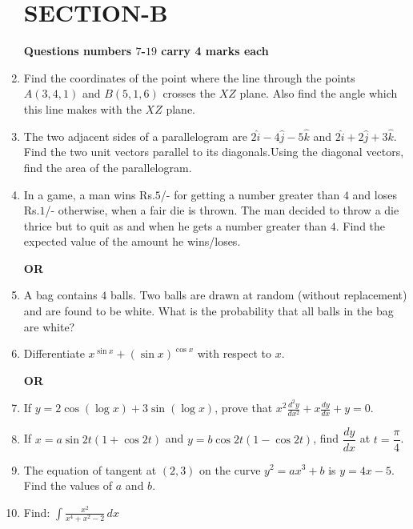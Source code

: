\documentclass[a4paper,12pt]{article}
\begin{document}
\begin{enumerate}[label=\textbf{\arabic*.}]
\begin{center}
	\section*{\large \textbf{SECTION-B}}
	\textbf{Questions numbers $7$-$19$ carry 4 marks each}
\end{center}
	\vspace{1em}
	\item Find the coordinates of the point where the line through the points $A(3, 4, 1)$ and $B(5, 1, 6)$ crosses the $XZ$ plane. Also find the angle which this line makes with the $XZ$ plane.
	\vspace{0.5em}
	\item The two adjacent sides of a parallelogram are $2\hat{i} - 4\hat{j} - 5\hat{k}$ and $2\hat{i} + 2\hat{j} + 3\hat{k}$. Find the two unit vectors parallel to its diagonals.Using the diagonal vectors, find the area of the parallelogram.
	\vspace{0.5em}
	\item In a game, a man wins Rs.$5$/- for getting a number greater than $4$ and loses Rs.$1$/- otherwise, when a fair die is thrown. The man decided to throw a die thrice but to quit as and when he gets a number greater than $4$. Find the expected value of the amount he wins/loses.
\begin{center}
    \textbf{OR} 
\end{center}
\item[] A bag contains $4$ balls. Two balls are drawn at random (without replacement) and are found to be white. What is the probability that all balls in the bag are white?
	\vspace{0.5em}
	\item Differentiate $x^{\sin x} + (\sin x)^{\cos x}$ with respect to $x$.
\begin{center}
\textbf{OR}
\end{center}
\item[] If $y = 2 \cos(\log x) + 3 \sin(\log x)$, prove that $x^2 \frac{d^2 y}{dx^2} + x \frac{dy}{dx} + y = 0.$
	\vspace{0.5em}
	\item If $x = a \sin 2t(1 + \cos 2t)$ and $y = b \cos 2t(1 - \cos 2t)$,  find $\dfrac{dy}{dx}$ at $t = \dfrac{\pi}{4}$.
	\vspace{0.5em}
	\item The equation of tangent at $(2, 3)$ on the curve $y^2 = ax^3 + b$ is $y = 4x - 5$. Find the values of $a$ and $b$.
	\vspace{0.5em}
	\item Find: $\int \frac{x^2}{x^4 + x^2 - 2} \, dx$
\end{enumerate}
\end{document}

